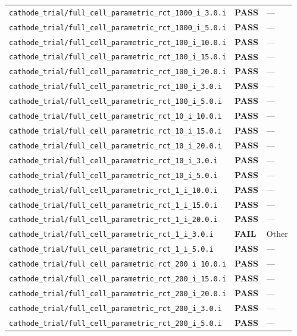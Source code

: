 \documentclass[10pt,letterpaper]{article}
\newcommand{\PASS}{\textcolor{passgreen}{\textbf{PASS}}}
\newcommand{\FAIL}{\textcolor{failred}{\textbf{FAIL}}}
\newcommand{\code}[1]{\texttt{\small #1}}
\begin{document}
\begin{longtable}{p{} l p{}}
\code{cathode\_trial/full\_cell\_parametric\_rct\_1000\_i\_3.0.i} & \PASS & --- \\
\code{cathode\_trial/full\_cell\_parametric\_rct\_1000\_i\_5.0.i} & \PASS & --- \\
\code{cathode\_trial/full\_cell\_parametric\_rct\_100\_i\_10.0.i} & \PASS & --- \\
\code{cathode\_trial/full\_cell\_parametric\_rct\_100\_i\_15.0.i} & \PASS & --- \\
\code{cathode\_trial/full\_cell\_parametric\_rct\_100\_i\_20.0.i} & \PASS & --- \\
\code{cathode\_trial/full\_cell\_parametric\_rct\_100\_i\_3.0.i} & \PASS & --- \\
\code{cathode\_trial/full\_cell\_parametric\_rct\_100\_i\_5.0.i} & \PASS & --- \\
\code{cathode\_trial/full\_cell\_parametric\_rct\_10\_i\_10.0.i} & \PASS & --- \\
\code{cathode\_trial/full\_cell\_parametric\_rct\_10\_i\_15.0.i} & \PASS & --- \\
\code{cathode\_trial/full\_cell\_parametric\_rct\_10\_i\_20.0.i} & \PASS & --- \\
\code{cathode\_trial/full\_cell\_parametric\_rct\_10\_i\_3.0.i} & \PASS & --- \\
\code{cathode\_trial/full\_cell\_parametric\_rct\_10\_i\_5.0.i} & \PASS & --- \\
\code{cathode\_trial/full\_cell\_parametric\_rct\_1\_i\_10.0.i} & \PASS & --- \\
\code{cathode\_trial/full\_cell\_parametric\_rct\_1\_i\_15.0.i} & \PASS & --- \\
\code{cathode\_trial/full\_cell\_parametric\_rct\_1\_i\_20.0.i} & \PASS & --- \\
\code{cathode\_trial/full\_cell\_parametric\_rct\_1\_i\_3.0.i} & \FAIL & Other \\
\code{cathode\_trial/full\_cell\_parametric\_rct\_1\_i\_5.0.i} & \PASS & --- \\
\code{cathode\_trial/full\_cell\_parametric\_rct\_200\_i\_10.0.i} & \PASS & --- \\
\code{cathode\_trial/full\_cell\_parametric\_rct\_200\_i\_15.0.i} & \PASS & --- \\
\code{cathode\_trial/full\_cell\_parametric\_rct\_200\_i\_20.0.i} & \PASS & --- \\
\code{cathode\_trial/full\_cell\_parametric\_rct\_200\_i\_3.0.i} & \PASS & --- \\
\code{cathode\_trial/full\_cell\_parametric\_rct\_200\_i\_5.0.i} & \PASS & --- \\

\end{longtable}
\end{document}

